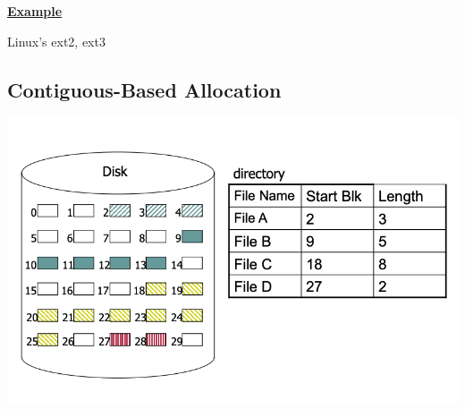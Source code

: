 \documentclass[12pt]{article}
\begin{document}
\bigskip

\underline{\textbf{Example}}

\bigskip

Linux's ext2, ext3

\subsection{Contiguous-Based Allocation}

\begin{center}
\includegraphics[width=\linewidth]{../images/midterm_2_solution_32.png}
\end{center}
\end{document}
